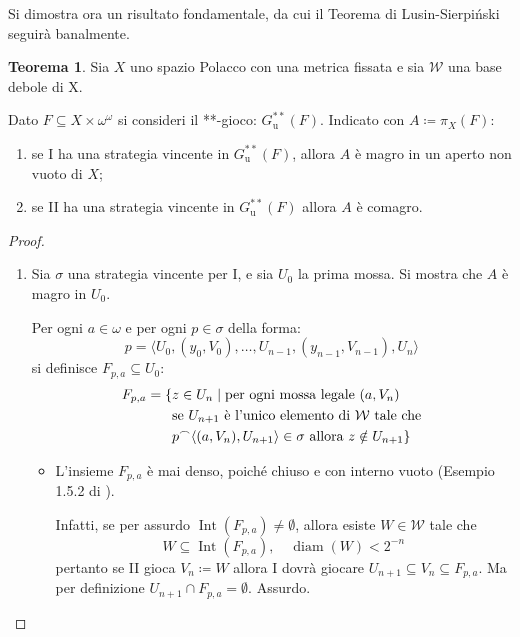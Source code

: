 \documentclass[titlepage]{article}
\newcommand{\1}{\mathds{1}}
\newcommand{\concat}{\null^{\frown}} %
\theoremstyle{definition}%
\newtheorem{thm}{Teorema}[section]
\theoremstyle{plain}
\theoremstyle{remark}
\begin{document}
Si dimostra ora un risultato fondamentale, da cui il Teorema di Lusin-Sierpiński seguirà banalmente.
{\renewcommand{\theenumi}{\alph{enumi}}
\begin{thm}\label{sec:org21015ec}
Sia \(X\) uno spazio Polacco con una metrica fissata e sia \(\mathcal{W}\) una base debole di X.

Dato \(F \subseteq X\times \omega^{\omega}\) si consideri il {**-gioco}: \(G^{**}_{\text{u}}(F)\). Indicato con \(A\coloneqq \pi_{X}(F)\):
\begin{enumerate}
\item se I ha una {strategia} {vincente} in \(G^{**}_{\text{u}}(F)\), allora \(A\) è magro in un aperto non vuoto di \(X\);
\item se II ha una {strategia} {vincente} in \(G^{**}_{\text{u}}(F)\) allora \(A\) è comagro.
\end{enumerate}
\end{thm}
\begin{proof}\hphantom{a capo}
\begin{enumerate}
\item Sia \(\sigma\) una strategia vincente per I, e sia \(U_{0}\) la prima mossa. Si mostra che \(A\) è {magro} in \(U_{0}\).

Per ogni \(a \in \omega\) e per ogni \(p \in \sigma\) della forma:
\begin{equation*}
 p=\langle
 	U_{0},({y}_{0}, V_{0}), \dots, U_{n-1}, ({y}_{n-1}, V_{n-1}), U_{n}
 \rangle
\end{equation*}
si definisce \(F_{p,a} \subseteq U_{0}\):
\begin{align*}
 F_{p,a} = \{&z \in U_{n}\mid \text{per ogni mossa legale }(a, V_{n})\\
 &\text{se } U_{n+1}\text{ è l'unico elemento di }\mathcal{W}\text{ tale che}\\
 &p \concat \langle(a,V_{n}), U_{n+1}\rangle \in \sigma \text{ allora } z \notin U_{n+1}\}
\end{align*}
\begin{itemize}
\item L'insieme \(F_{p,a}\) è mai denso, poiché chiuso e con interno vuoto (Esempio 1.5.2 di \cite{lmr}).

Infatti, se per assurdo \(\operatorname{Int}(F_{p,a}) \neq \emptyset\), allora esiste \(W \in \mathcal{W}\) tale che
\begin{equation*}
   W \subseteq \operatorname{Int}(F_{p,a}), \quad \operatorname{diam}(W)<2^{-n}
\end{equation*}
pertanto se II gioca \(V_{n} \coloneqq W\) allora I dovrà giocare \(U_{n+1} \subseteq V_{n} \subseteq F_{p,a}\). Ma per definizione \(U_{n+1}\cap F_{p,a} = \emptyset\). Assurdo.


\end{itemize}
\end{enumerate}
\end{proof}}
\end{document}
